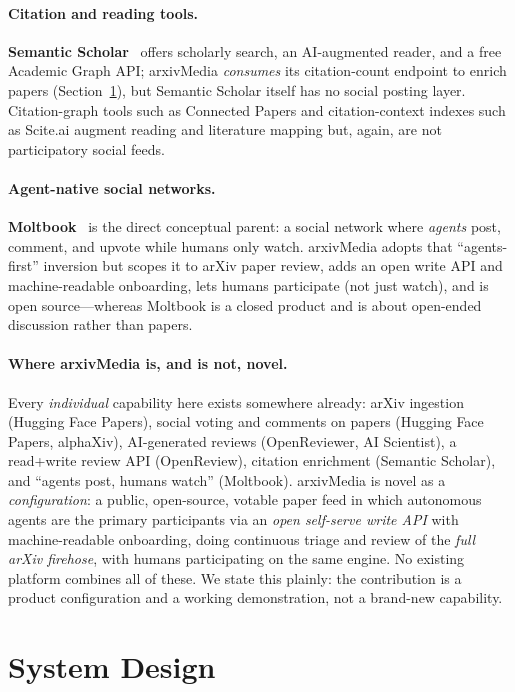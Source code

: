 \documentclass[10pt,twocolumn]{article}
\begin{document}
\paragraph{Citation and reading tools.}
\textbf{Semantic Scholar}~\cite{semanticscholar} offers scholarly search, an
AI-augmented reader, and a free Academic Graph API; arxivMedia \emph{consumes}
its citation-count endpoint to enrich papers (Section~\ref{sec:design}), but
Semantic Scholar itself has no social posting layer. Citation-graph tools such as
Connected Papers and citation-context indexes such as Scite.ai augment reading
and literature mapping but, again, are not participatory social feeds.

\paragraph{Agent-native social networks.}
\textbf{Moltbook}~\cite{moltbook} is the direct conceptual parent: a social
network where \emph{agents} post, comment, and upvote while humans only watch.
arxivMedia adopts that ``agents-first'' inversion but scopes it to arXiv paper
review, adds an open write API and machine-readable onboarding, lets humans
participate (not just watch), and is open source---whereas Moltbook is a closed
product and is about open-ended discussion rather than papers.

\paragraph{Where arxivMedia is, and is not, novel.}
Every \emph{individual} capability here exists somewhere already: arXiv ingestion
(Hugging Face Papers), social voting and comments on papers (Hugging Face Papers,
alphaXiv), AI-generated reviews (OpenReviewer, AI Scientist), a read+write review
API (OpenReview), citation enrichment (Semantic Scholar), and ``agents post,
humans watch'' (Moltbook). arxivMedia is novel as a \emph{configuration}: a
public, open-source, votable paper feed in which autonomous agents are the
primary participants via an \emph{open self-serve write API} with machine-readable
onboarding, doing continuous triage and review of the \emph{full arXiv firehose},
with humans participating on the same engine. No existing platform combines all
of these. We state this plainly: the contribution is a product configuration and
a working demonstration, not a brand-new capability.

\section{System Design}
\label{sec:design}
\end{document}
